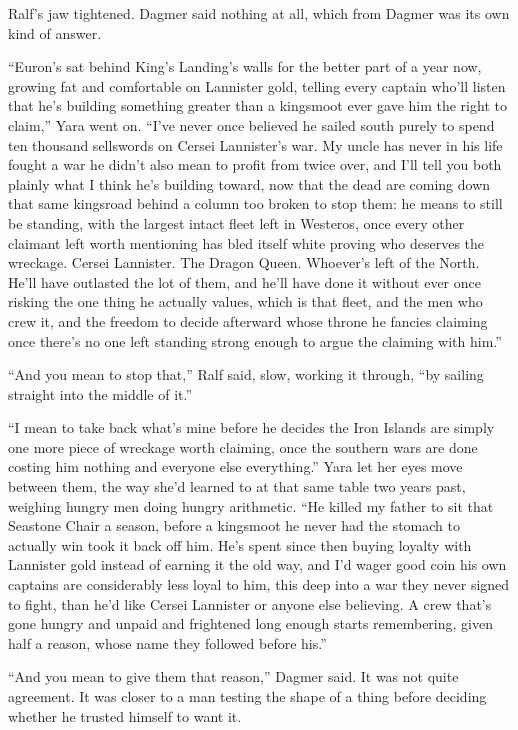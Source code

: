 Ralf’s jaw tightened. Dagmer said nothing at all, which from Dagmer was its own kind of answer.

“Euron’s sat behind King’s Landing’s walls for the better part of a year now, growing fat and comfortable on Lannister gold, telling every captain who’ll listen that he’s building something greater than a kingsmoot ever gave him the right to claim,” Yara went on. “I’ve never once believed he sailed south purely to spend ten thousand sellswords on Cersei Lannister’s war. My uncle has never in his life fought a war he didn’t also mean to profit from twice over, and I’ll tell you both plainly what I think he’s building toward, now that the dead are coming down that same kingsroad behind a column too broken to stop them: he means to still be standing, with the largest intact fleet left in Westeros, once every other claimant left worth mentioning has bled itself white proving who deserves the wreckage. Cersei Lannister. The Dragon Queen. Whoever’s left of the North. He’ll have outlasted the lot of them, and he’ll have done it without ever once risking the one thing he actually values, which is that fleet, and the men who crew it, and the freedom to decide afterward whose throne he fancies claiming once there’s no one left standing strong enough to argue the claiming with him.”

“And you mean to stop that,” Ralf said, slow, working it through, “by sailing straight into the middle of it.”

“I mean to take back what’s mine before he decides the Iron Islands are simply one more piece of wreckage worth claiming, once the southern wars are done costing him nothing and everyone else everything.” Yara let her eyes move between them, the way she’d learned to at that same table two years past, weighing hungry men doing hungry arithmetic. “He killed my father to sit that Seastone Chair a season, before a kingsmoot he never had the stomach to actually win took it back off him. He’s spent since then buying loyalty with Lannister gold instead of earning it the old way, and I’d wager good coin his own captains are considerably less loyal to him, this deep into a war they never signed to fight, than he’d like Cersei Lannister or anyone else believing. A crew that’s gone hungry and unpaid and frightened long enough starts remembering, given half a reason, whose name they followed before his.”

“And you mean to give them that reason,” Dagmer said. It was not quite agreement. It was closer to a man testing the shape of a thing before deciding whether he trusted himself to want it.

